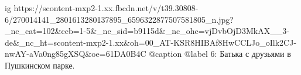  
 
 
 
 

\ifcmt
  ig https://scontent-mxp2-1.xx.fbcdn.net/v/t39.30808-6/270014141_2801613280137895_6596322877507581805_n.jpg?_nc_cat=102&ccb=1-5&_nc_sid=b9115d&_nc_ohc=vjDvbOjD3MkAX__3-de&_nc_ht=scontent-mxp2-1.xx&oh=00_AT-KSR8HIBAf8HwCCLJo_oIlk2CJ-nwAY-aVa0ng85gXSQ&oe=61DA0B4C
  @caption @label 6: Батька с друзьями в Пушкинском парке.
\fi
